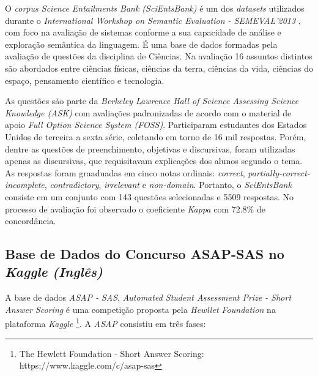 O \textit{corpus Science Entailments Bank (SciEntsBank)} \cite{dzikovska2012} é um dos \textit{datasets} utilizados durante o \textit{International Workshop on Semantic Evaluation - SEMEVAL'2013} \cite{dzikovska2013}, com foco na avaliação de sistemas conforme a sua capacidade de análise e exploração semântica da linguagem. É uma base de dados formadas pela avaliação de questões da disciplina de Ciências. Na avaliação 16 assuntos distintos são abordados entre ciências físicas, ciências da terra, ciências da vida, ciências do espaço, pensamento científico e tecnologia. 

As questões são parte da \textit{Berkeley Lawrence Hall of Science Assessing Science Knowledge (ASK)} com avaliações padronizadas de acordo com o material de apoio \textit{Full Option Science System (FOSS)}. Participaram estudantes dos Estados Unidos de terceira a sexta série, coletando em torno de 16 mil respostas. Porém, dentre as questões de preenchimento, objetivas e discursivas, foram utilizadas apenas as discursivas, que requisitavam explicações dos alunos segundo o tema. As respostas foram graaduadas em cinco notas ordinais: \textit{correct}, \textit{partially-correct-incomplete}, \textit{contradictory}, \textit{irrelevant} e \textit{non-domain}. Portanto, o \textit{SciEntsBank} consiste em um conjunto com 143 questões selecionadas e 5509 respostas. No processo de avaliação foi observado o coeficiente \textit{Kappa} com 72.8\% de concordância.

\subsection{Base de Dados do Concurso ASAP-SAS no \textit{Kaggle} \textit{(Inglês)}}
\label{kaggle-db}

A base de dados \textit{ASAP - SAS}, \textit{Automated Student Assessment Prize - Short Answer Scoring} é uma competição proposta pela \textit{Hewllet Foundation} na plataforma \textit{Kaggle} \footnote{The Hewlett Foundation - Short Answer Scoring: https://www.kaggle.com/c/asap-sas}. A \textit{ASAP} consistiu em três fases:

